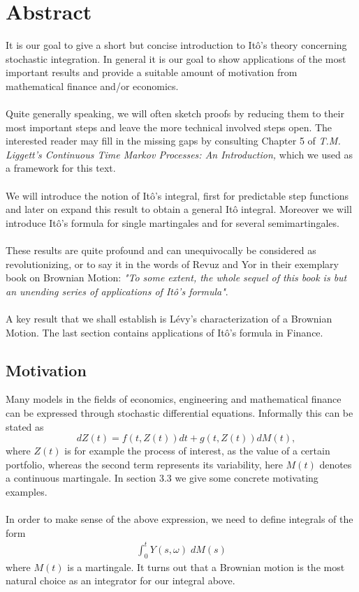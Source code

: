 \documentclass[11pt,a4paper, final]{article}
\begin{document}
\section{Abstract}
It is our goal to give a short but concise introduction to Itô's theory concerning stochastic integration. In general it is our goal to show applications of the most important results and provide a suitable amount of motivation from mathematical finance and/or economics. 
\\\\
Quite generally speaking, we will often sketch proofs by reducing them to their most important steps and leave the more technical involved steps open. The interested reader may fill in the missing gaps by consulting  Chapter 5 of \textit{T.M. Liggett's Continuous Time Markov Processes: An Introduction,} which we used as a framework for this text. 
\\\\
We will introduce the notion of Itô's integral, first for predictable step functions and later on expand this result to obtain a general Itô integral. Moreover we will introduce Itô's formula for single martingales and for several semimartingales.
\\\\
\noindent These results are quite profound and can unequivocally be considered as revolutionizing, or to say it in the words of Revuz and Yor in their exemplary book on Brownian Motion: \textit{"To some extent, the whole sequel of this book is but an unending series of applications of Itô's formula"}.
\\\\
A key result that we shall establish is Lévy's characterization of a Brownian Motion. The last section contains applications of Itô's formula in Finance. 
\subsection{Motivation}
\noindent Many models in the fields of economics, engineering and mathematical finance can be expressed through stochastic differential equations. Informally this can be stated as
$$ \quad dZ(t) = f(t, Z(t))dt + g(t,Z(t)) dM(t), $$
where $Z(t)$ is for example the process of interest, as the value of a certain portfolio, whereas the second term represents its variability, here $M(t)$ denotes a continuous martingale. In section 3.3 we give some concrete motivating examples. \\
\\
In order to make sense of the above expression, we need to define integrals of the form
\begin{align*} \int_0^t Y(s,\omega) \; dM(s) \tag{$\star$} 
\end{align*}
where $M(t)$ is a martingale. It turns out that a Brownian motion is the most natural choice as an integrator for our integral above. 
\newpage 
\end{document}
